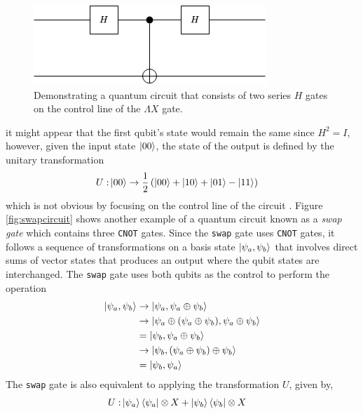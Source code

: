 \begin{figure}[!ht]
	\centering
	\includegraphics[width=0.75\linewidth]{body/ch2/figs/q-circuit-caution}
	\caption[The output of a qubit cannot be accurately determined by looking at a single line in a quantum circuit.]{Demonstrating a quantum circuit that consists of two series $H$ gates on the control line of the $\Lambda X$ gate.}
	\label{fig:hadamard2circuit}
\end{figure}
it might appear that the first qubit's state would remain the same since $H^2 = I$, however, given the input state $\ket{00}$, the state of the output is defined by the unitary transformation
\begin{align}
	U: & \ket{00} \rightarrow \frac{1}{2}\left(\ket{00} + \ket{10} + \ket{01} - \ket{11}\right) \nonumber
\end{align}
which is not obvious by focusing on the control line of the circuit \cite{Rieffel2011}. Figure \ref{fig:swapcircuit} shows another example of a quantum circuit known as a \textit{swap gate} which contains three \texttt{CNOT} gates. Since the \texttt{swap} gate uses \texttt{CNOT} gates, it follows a sequence of transformations on a basis state $\ket{\psi_a, \psi_b}$ that involves direct sums of vector states that produces an output where the qubit states are interchanged. The \texttt{swap} gate uses both qubits as the control to perform the operation
\begin{align}
	\ket{\psi_a, \psi_b}	&\rightarrow \ket{\psi_a, \psi_a\oplus \psi_b}\nonumber\\
				&\rightarrow \ket{\psi_a\oplus (\psi_a\oplus \psi_b), \psi_a\oplus \psi_b}\nonumber\\
				& = \ket{\psi_b, \psi_a\oplus\psi_b}\nonumber\\
				& \rightarrow \ket{\psi_b, (\psi_a\oplus\psi_b)\oplus\psi_b}\nonumber\\
				& = \ket{\psi_b, \psi_a}
\end{align}
The \texttt{swap} gate is also equivalent to applying the transformation $U$, given by,
\begin{align}
	U: & \ket{\psi_a}\bra{\psi_a}\otimes X	+ \ket{\psi_b}\bra{\psi_b} \otimes X
\end{align}
